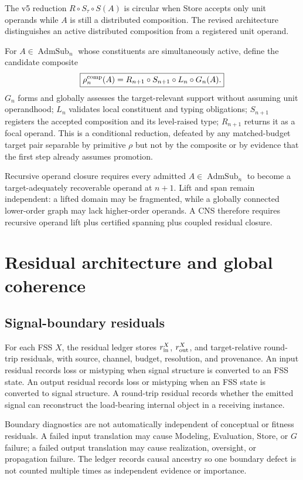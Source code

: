 \documentclass[11pt]{article}
\newcommand{\AdmSub}{\operatorname{AdmSub}}
\begin{document}
The v5 reduction $R\circ S_\tau\circ S(A)$ is circular when Store accepts only unit operands while $A$ is still a distributed composition. The revised architecture distinguishes an active distributed composition from a registered unit operand.

For $A\in\AdmSub_n$ whose constituents are simultaneously active, define the candidate composite
\begin{equation}
\boxed{\rho_n^{\rm comp}(A)=R_{n+1}\circ S_{n+1}\circ L_n\circ G_n(A).}
\end{equation}
$G_n$ forms and globally assesses the target-relevant support without assuming unit operandhood; $L_n$ validates local constituent and typing obligations; $S_{n+1}$ registers the accepted composition and its level-raised type; $R_{n+1}$ returns it as a focal operand. This is a conditional reduction, defeated by any matched-budget target pair separable by primitive $\rho$ but not by the composite or by evidence that the first step already assumes promotion.

Recursive operand closure requires every admitted $A\in\AdmSub_n$ to become a target-adequately recoverable operand at $n+1$. Lift and span remain independent: a lifted domain may be fragmented, while a globally connected lower-order graph may lack higher-order operands. A CNS therefore requires recursive operand lift plus certified spanning plus coupled residual closure.

\section{Residual architecture and global coherence}

\subsection{Signal-boundary residuals}

For each FSS $X$, the residual ledger stores $r_{\rm in}^{X}$, $r_{\rm out}^{X}$, and target-relative round-trip residuals, with source, channel, budget, resolution, and provenance. An input residual records loss or mistyping when signal structure is converted to an FSS state. An output residual records loss or mistyping when an FSS state is converted to signal structure. A round-trip residual records whether the emitted signal can reconstruct the load-bearing internal object in a receiving instance.

Boundary diagnostics are not automatically independent of conceptual or fitness residuals. A failed input translation may cause Modeling, Evaluation, Store, or $G$ failure; a failed output translation may cause realization, oversight, or propagation failure. The ledger records causal ancestry so one boundary defect is not counted multiple times as independent evidence or importance.
\end{document}
